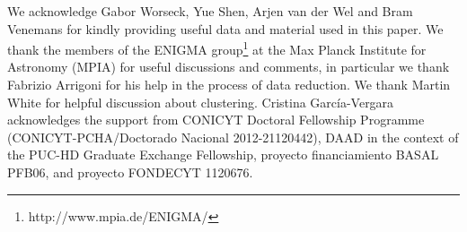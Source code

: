 \documentclass[iop, revtex4]{emulateapj}
\begin{document}
\acknowledgments
We acknowledge Gabor Worseck, Yue Shen, Arjen van der Wel and Bram Venemans for kindly providing useful data and material used in this paper. We thank the members of the ENIGMA group\footnote{http://www.mpia.de/ENIGMA/} at the Max Planck Institute for Astronomy (MPIA) for useful discussions and comments, in particular we thank Fabrizio Arrigoni for his help in the process of data reduction. We thank Martin White for helpful discussion about clustering. Cristina Garc\'ia-Vergara acknowledges the support from CONICYT Doctoral Fellowship Programme (CONICYT-PCHA/Doctorado Nacional 2012-21120442), DAAD in the context of the PUC-HD Graduate Exchange Fellowship, proyecto financiamiento BASAL PFB06, and proyecto FONDECYT 1120676. 


\end{document}
